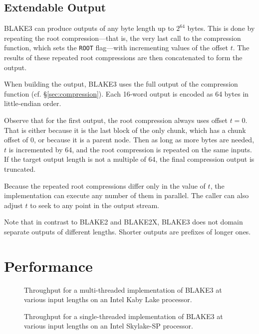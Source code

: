 \documentclass[11pt,notitlepage,a4paper]{article}
\begin{document}
\subsection{Extendable Output}\label{sec:extendable}

BLAKE3 can produce outputs of any byte length up to $2^{64}$ bytes. 
This is done by repeating the root compression---that is, the very last 
call to the compression function, which sets the \texttt{ROOT} flag---with 
incrementing values of the offset $t$. The results of these repeated root 
compressions are then concatenated to form the output.

When building the output, BLAKE3 uses the full output of the
compression function (cf. \S\ref{sec:compression}). Each 16-word output is
encoded as 64 bytes in little-endian order.

Observe that for the first output, the root compression always uses offset $t
= 0$. That is either because it is the last block of the only chunk, which has
a chunk offset of $0$, or because it is a parent node. Then as long as more 
bytes are needed, $t$ is incremented by 64, and the root compression is 
repeated on the same inputs. If the target output length is not a multiple of 64, 
the final compression output is truncated.

Because the repeated root compressions differ only in the value of $t$, the
implementation can execute any number of them in parallel. The caller can also
adjust $t$ to seek to any point in the output stream.

Note that in contrast to BLAKE2 and BLAKE2X, BLAKE3 does not domain separate
outputs of different lengths. Shorter outputs are prefixes of longer ones.

\section{Performance}\label{sec:performance}

\begin{figure}[h]
\centering
%

\caption{Throughput for a multi-threaded implementation of BLAKE3 at various
    input lengths on an Intel Kaby Lake processor.}
\label{fig:avx2_rayon}
\end{figure}

\begin{figure}[h]
\centering
%

\caption{Throughput for a single-threaded implementation of BLAKE3 at various
    input lengths on an Intel Skylake-SP processor.}%
\label{fig:avx512_c}
\end{figure}
\end{document}
